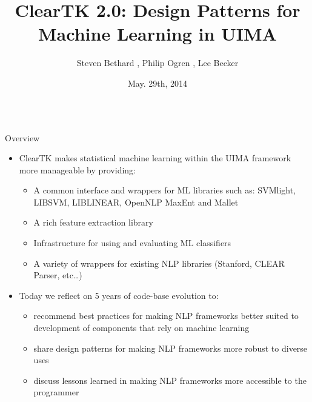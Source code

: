 \documentclass[final]{beamer}
\title{\Huge ClearTK 2.0: Design Patterns for Machine Learning in UIMA\\[0.2ex]}
\author{Steven Bethard \inst{1}, Philip Ogren \inst{2}, Lee Becker\inst{2}}
\institute[] %
{
  \inst{1}%
  University of Alabama at Birmingham, Birmingham, AL, USA
  \\
  \inst{2}%
  University of Colorado Boulder, Boulder, CO, USA
}
\date[May. 29th, 2014]{May. 29th, 2014}
\begin{document}
\begin{frame}{} 
\vspace{-1cm}
\begin{columns}[t]
  \begin{column}{.45\linewidth}
    
    \begin{block}{Overview}
      \begin{itemize}
      \item ClearTK makes statistical machine learning within the UIMA framework more manageable by providing:

        \begin{itemize}
        \item A common interface and wrappers for ML libraries such as: SVMlight, LIBSVM, LIBLINEAR, OpenNLP MaxEnt and Mallet
        \item A rich feature extraction library
        \item Infrastructure for using and evaluating ML classifiers
        \item A variety of wrappers for existing NLP libraries (Stanford, CLEAR Parser, etc\ldots)
        \end{itemize}

      \item Today we reflect on 5 years of code-base evolution to:
        \begin{itemize}
        \item recommend best practices for making NLP frameworks better suited to development of components that rely on machine learning 
        \item share design patterns for making NLP frameworks more robust to diverse uses
        \item discuss lessons learned in making NLP frameworks more accessible to the programmer
        \end{itemize}
      \end{itemize}
    \end{block}
    

\end{column}
\end{columns}
\end{frame}
\end{document}
